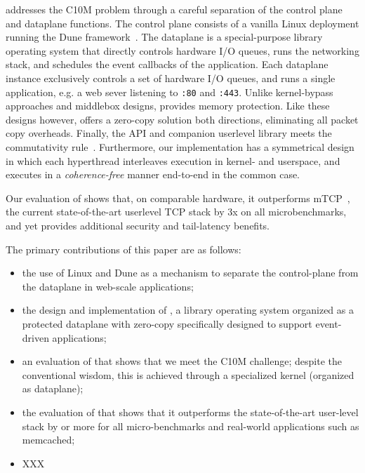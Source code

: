 \ix addresses the C10M problem through a careful separation of the
control plane and dataplane functions.  The control plane consists of a
vanilla Linux deployment running the Dune
framework~\cite{belay2012dune}.  The dataplane is a special-purpose
library operating system that directly controls hardware I/O queues,
runs the networking stack, and schedules the event callbacks of the
application.  Each dataplane instance exclusively controls a set of
hardware I/O queues, and runs a single application, e.g. a web sever
listening to \texttt{:80} and \texttt{:443}.  Unlike kernel-bypass
approaches and middlebox designs, \ix provides memory protection.
Like these designs however, \ix offers a zero-copy solution both
directions, eliminating all packet copy overheads.  Finally, the \ix
API and companion userlevel library meets the commutativity
rule~\cite{DBLP:conf/sosp/ClementsKZMK13}. Furthermore, our
implementation has a symmetrical design in which each hyperthread
interleaves execution in kernel- and userspace, and executes in a
\emph{coherence-free} manner end-to-end in the common case.

Our evaluation of \ix shows that, on comparable hardware, it
outperforms mTCP~\cite{jeong2014mtcp}, the current state-of-the-art userlevel TCP stack by
3x on all microbenchmarks, and yet provides additional security and
tail-latency benefits.


The primary contributions of this paper are as follows:

\begin{itemize}

\item  the use of Linux and Dune as a mechanism to separate the control-plane from the dataplane in web-scale applications;

\item the design and implementation of \ix, a library operating system
  organized as a protected dataplane with zero-copy specifically
  designed to support event-driven applications;

\item an evaluation of \ix that shows that we meet the C10M challenge;
  despite the conventional wisdom, this is achieved through a
  specialized kernel (organized as dataplane);

\item the evaluation of \ix that shows that it outperforms the
  state-of-the-art user-level stack by  or more for all
  micro-benchmarks and real-world applications such as memcached;

\item XXX

\end{itemize}


